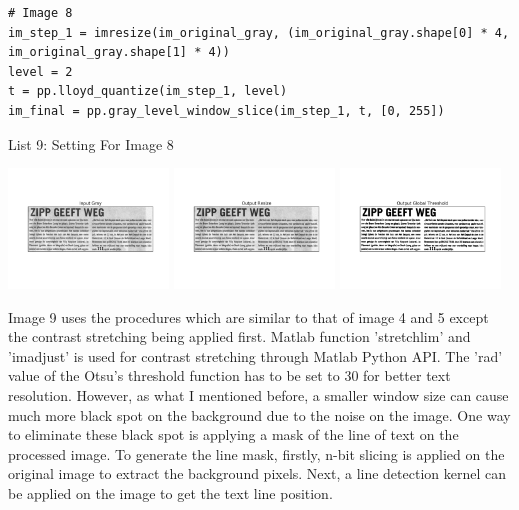 \documentclass[titlepage]{article}
\begin{document}
\begin{listing}
\begin{verbatim}
# Image 8 
im_step_1 = imresize(im_original_gray, (im_original_gray.shape[0] * 4, im_original_gray.shape[1] * 4))
level = 2
t = pp.lloyd_quantize(im_step_1, level)
im_final = pp.gray_level_window_slice(im_step_1, t, [0, 255])
\end{verbatim}
\centering
\caption{List 9: Setting For Image 8}
\newline
\end{listing}

\begin{center}
\includegraphics[width=0.32\textwidth]{img_8_gray.png}
\includegraphics[width=0.32\textwidth]{img_8_output_resize.png}
\includegraphics[width=0.32\textwidth]{img_8_output_thresh.png}
\end{center}

Image 9 uses the procedures which are similar to that of image 4 and 5 except
the contrast stretching being applied first. Matlab function 'stretchlim' and
'imadjust' is used for contrast stretching through Matlab Python API. The
'rad' value of the Otsu's threshold function has to be set to 30 for better
text resolution. However, as what I mentioned before, a smaller window size
can cause much more black spot on the background due to the noise on the
image. One way to eliminate these black spot is applying a mask of the line of
text on the processed image. To generate the line mask, firstly, n-bit slicing
is applied on the original image to extract the background pixels. Next, a
line detection kernel can be applied on the image to get the text line
position.
\end{document}
